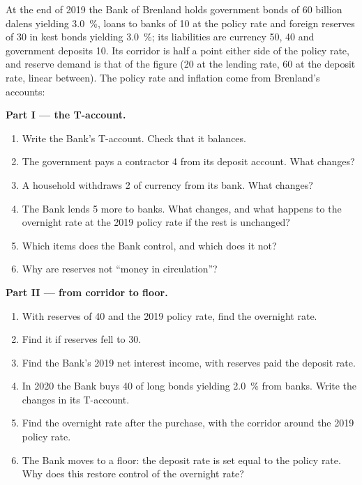 \begin{problem}\label{pb:b3:central-banking:bank}
At the end of 2019 the Bank of Brenland holds government bonds of 60 billion
dalens yielding 3.0~\%, loans to banks of 10 at the policy rate and foreign reserves of
30 in kest bonds yielding 3.0~\%; its liabilities are currency 50,  40 and
government deposits 10. Its corridor is half a point either side of the policy
rate, and reserve demand is that of the figure (20 at the lending rate, 60 at the
deposit rate, linear between). The policy rate and inflation come from Brenland's
accounts:
\begin{center}\small
{}
\end{center}

\medskip\noindent\textbf{Part I --- the T-account.}
\begin{enumerate}
\item Write the Bank's T-account. Check that it balances.
\item The government pays a contractor 4 from its deposit account. What changes?
\item A household withdraws 2 of currency from its bank. What changes?
\item The Bank lends 5 more to banks. What changes, and what happens to the
overnight rate at the 2019 policy rate if the rest is unchanged?
\item Which items does the Bank control, and which does it not?
\item Why are reserves not ``money in circulation''?
\end{enumerate}

\medskip\noindent\textbf{Part II --- from corridor to floor.}
\begin{enumerate}[resume]
\item With reserves of 40 and the 2019 policy rate, find the overnight rate.
\item Find it if reserves fell to 30.
\item Find the Bank's 2019 net interest income, with reserves paid the deposit rate.
\item In 2020 the Bank buys 40 of long bonds yielding 2.0~\% from banks. Write the
changes in its T-account.
\item Find the overnight rate after the purchase, with the corridor around the 2019
policy rate.
\item The Bank moves to a floor: the deposit rate is set equal to the policy rate.
Why does this restore control of the overnight rate?
\end{enumerate}


\end{problem}
